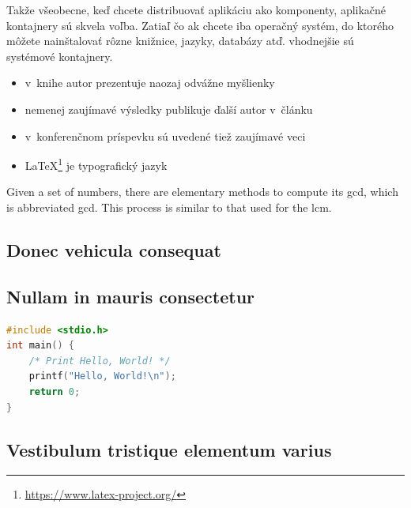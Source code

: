 Takže všeobecne, keď chcete distribuovať aplikáciu ako komponenty, aplikačné kontajnery sú skvela voľba. Zatiaľ čo ak chcete iba operačný systém, do ktorého môžete nainštalovať rôzne knižnice, jazyky, databázy atď. vhodnejšie sú systémové kontajnery.


\clearpage
\begin{itemize}
    \item v~knihe \cite{book} autor prezentuje naozaj odvážne myšlienky
    \item nemenej zaujímavé výsledky publikuje ďalší autor v~článku \cite{article} 
    \item v~konferenčnom príspevku \cite{conference} sú uvedené tiež zaujímavé veci
    \item \LaTeX{}\footnote{\url{https://www.latex-project.org/}} je typografický jazyk
\end{itemize}

Given a set of numbers, there are elementary methods to compute its \acrlong{gcd}, which is abbreviated \acrshort{gcd}. This process is similar to that used for the \acrfull{lcm}.

\subsection{Donec vehicula consequat}
\blindtext



\subsection{Nullam in mauris consectetur}
\blindtext

\begin{lstlisting}[language=C,caption={Program, ktorý pozdraví celý svet}]
#include <stdio.h>
int main() {
    /* Print Hello, World! */
    printf("Hello, World!\n");
    return 0;
}
\end{lstlisting}


\subsection{Vestibulum tristique elementum varius}
\blindtext

